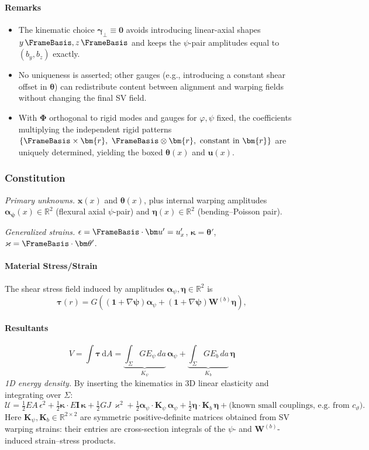\paragraph{Remarks}
\begin{itemize}
\item The kinematic choice \(\bm{\gamma}_\perp\equiv \mathbf{0}\) avoids introducing linear-axial shapes \(y\,\FrameBasis,z\,\FrameBasis\) and keeps the \(\psi\)-pair amplitudes equal to \((b_y,b_z)\) exactly.  
\item No uniqueness is asserted; other gauges (e.g., introducing a constant shear offset in \(\bm\theta\)) can redistribute content between alignment and warping fields without changing the final SV field.
\item With \(\bm\Phi\) orthogonal to rigid modes and gauges for \(\varphi,\psi\) fixed, the coefficients multiplying the independent rigid patterns
\(\{\FrameBasis\times\bm{r},\ \FrameBasis\otimes\bm{r},\ \text{constant in }\bm{r}\}\)
are uniquely determined, yielding the boxed \(\bm\theta(x)\) and \(\bm u(x)\).
\end{itemize}

\subsubsection{Constitution}
\emph{Primary unknowns.}\;
\(\bm x(x)\) and \(\bm\theta(x)\), plus internal warping amplitudes
\(\bm{\alpha_{\psi}}(x)\in\mathbb{R}^2\) (flexural axial \(\psi\)-pair) and
\(\bm{\eta}(x)\in\mathbb{R}^2\) (bending–Poisson pair).

\emph{Generalized strains.}\;
\(\epsilon=\FrameBasis\cdot\bm u'=u_x'\),\;
\(\bm{\kappa}=\bm\theta'\),\;
\(\varkappa=\FrameBasis\cdot\bm\theta'\).

\paragraph{Material Stress/Strain}
The shear stress field induced by amplitudes $\bm{\alpha}_{\psi}, \bm\eta \in \mathbb{R}^2$ is
$$
\bm\tau(r)=G\left((\mathbf{1} + \nabla \bm{\psi}) \bm\alpha_{\psi}
+(\mathbf{1} + \nabla \bm{\psi})\bm{W}^{(b)}\bm\eta
\right),
$$
\paragraph{Resultants}
\[
V=\int \bm{\tau}\,\mathrm{d}A = \underbrace{\int_{\Sigma} G E_\psi \, d a }_{K_\psi}\,\bm\alpha_{\psi} 
+\underbrace{\int_{\Sigma} G E_b \,d a}_{K_b}\,\bm\eta
\]
\emph{1D energy density.}\; By inserting the kinematics in 3D linear elasticity and integrating over \(\Sigma\):
\[
\mathcal{U}
=\tfrac{1}{2} EA\,\epsilon^2
+\tfrac{1}{2} \bm{\kappa}\cdot E\mathbf{I}\,\bm{\kappa}
+\tfrac{1}{2} GJ\,\varkappa^2
+\tfrac{1}{2} \bm\alpha_{\psi} \cdot \mathbf{K}_\psi\,\bm\alpha_{\psi}
+\tfrac{1}{2} \bm\eta \cdot \mathbf{K}_b\,\bm\eta
+\text{(known small couplings, e.g.\ from }c_\vartheta).
\]
Here \(\mathbf{K}_\psi,\mathbf{K}_b\in\mathbb{R}^{2\times 2}\) are symmetric positive-definite matrices obtained from SV warping strains:
their entries are cross-section integrals of the \(\psi\)- and \(\bm{W}^{(b)}\)-induced strain–stress products.

